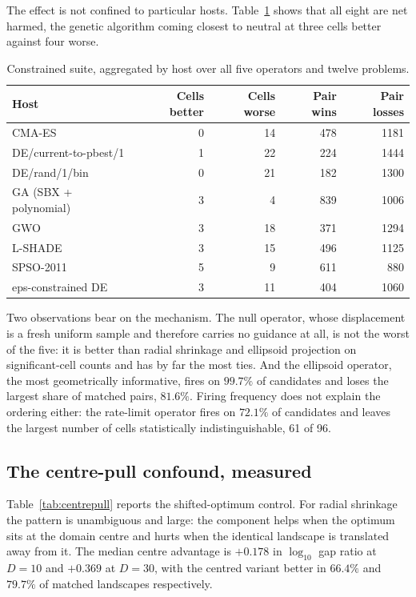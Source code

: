 \documentclass[11pt,a4paper]{article}
\begin{document}
The effect is not confined to particular hosts. Table~\ref{tab:host} shows that all eight
are net harmed, the genetic algorithm coming closest to neutral at three cells better
against four worse.

\begin{table}[htbp]
\centering
\caption{Constrained suite, aggregated by host over all five operators and twelve
problems.}
\label{tab:host}
\begin{tabular}{lrrrr}
\toprule
Host & Cells better & Cells worse & Pair wins & Pair losses \\
\midrule
CMA-ES & 0 & 14 & 478 & 1181 \\
DE/current-to-pbest/1 & 1 & 22 & 224 & 1444 \\
DE/rand/1/bin & 0 & 21 & 182 & 1300 \\
GA (SBX + polynomial) & 3 & 4 & 839 & 1006 \\
GWO & 3 & 18 & 371 & 1294 \\
L-SHADE & 3 & 15 & 496 & 1125 \\
SPSO-2011 & 5 & 9 & 611 & 880 \\
eps-constrained DE & 3 & 11 & 404 & 1060 \\
\bottomrule
\end{tabular}
\end{table}

Two observations bear on the mechanism. The null operator, whose displacement is a fresh
uniform sample and therefore carries no guidance at all, is not the worst of the five: it
is better than radial shrinkage and ellipsoid projection on significant-cell counts and
has by far the most ties. And the ellipsoid operator, the most geometrically informative, fires on $99.7\%$ of candidates and loses the largest share of matched pairs, $81.6\%$. Firing frequency does not
explain the ordering either: the rate-limit operator fires on $72.1\%$ of candidates and
leaves the largest number of cells statistically indistinguishable, 61 of 96.

\subsection{The centre-pull confound, measured}

Table~\ref{tab:centrepull} reports the shifted-optimum control. For radial shrinkage the
pattern is unambiguous and large: the component helps when the optimum sits at the domain
centre and hurts when the identical landscape is translated away from it. The median
centre advantage is $+0.178$ in $\log_{10}$ gap ratio at $D=10$ and $+0.369$ at $D=30$,
with the centred variant better in $66.4\%$ and $79.7\%$ of matched landscapes
respectively.
\end{document}
